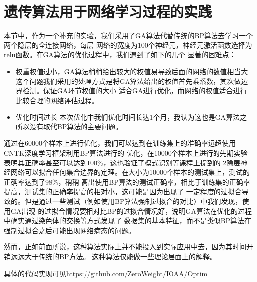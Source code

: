 \documentclass[UTF8,a4paper]{paper}
\begin{document}
\section{遗传算法用于网络学习过程的实践}
本节中，作为一个补充的实验，我们采用了GA算法代替传统的BP算法去学习一个两个隐层的全连接网络，每层
网络的宽度为100个神经元，神经元激活函数选择为relu函数。在GA算法的优化过程中，我们遇到了如下的几个
显著的困难点：
\begin{itemize}
\item {权重权值过小，GA算法稍稍给出较大的权值易导致后面的网络的数值相当大}
这个问题我们采用的处理方式是将GA算法给出的权值首先乘系数，其次做边界检测。保证GA环节权值的大小
适合GA进行优化，而网络的权值适合进行比较合理的网络评估过程。
\item {优化时间过长}
本次优化中我们优化时间长达1个月，我认为这也是GA算法之所以没有取代BP算法的主要问题。
\end{itemize}
通过在60000个样本上进行优化，我们可以达到在训练集上的准确率远超使用CNTK深度学习框架利用BP算法进行的
优化，在10000个样本上进行的先期实验表明其正确率甚至可以达到100\%，这也验证了模式识别等课程上提到的
2隐层神经网络可以拟合任何集合边界的定理。在大小为10000个样本的测试集上，测试的正确率达到了98\%，稍稍
高出使用BP算法的测试正确率，相比于训练集的正确率提高，测试集的正确率提高的相对小，这可能是因为出现了
一定程度的过拟合导致的。但是通过一些测试（例如使用BP算法强制过拟合的对比）中我们发现，使用GA出现
的过拟合情况要相对比BP的过拟合情况好，说明GA算法在优化的过程中确实通过染色体的交换等方式发现了
数据集的基本特征，而不是类似BP算法在强制过拟合之后可能出现网络病态的问题。

然而，正如前面所说，这种算法实际上并不能投入到实际应用中去，因为其时间开销远远大于传统的BP方法。
这种算法仅能做一些理论层面上的解释。

具体的代码实现可见\url{https://github.com/ZeroWeight/IOAA/Optim}

\end{document}

